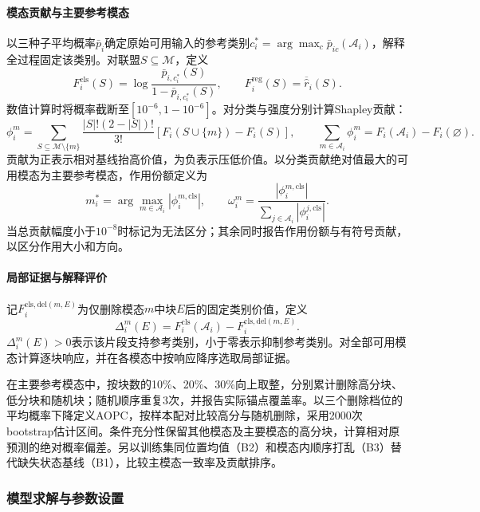 \paragraph{模态贡献与主要参考模态}
以三种子平均概率$\bar p_i$确定原始可用输入的参考类别$c_i^*=\arg\max_c\bar p_{ic}(\mathcal A_i)$，解释全过程固定该类别。对联盟$S\subseteq\mathcal M$，定义
\begin{equation}
F_i^{\mathrm{cls}}(S)=\log\frac{\bar p_{i,c_i^*}(S)}{1-\bar p_{i,c_i^*}(S)},\qquad
F_i^{\mathrm{reg}}(S)=\overline{\widehat r}_i(S).
\end{equation}
数值计算时将概率截断至$[10^{-6},1-10^{-6}]$。对分类与强度分别计算Shapley贡献：
\begin{equation}
\phi_i^m=\sum_{S\subseteq\mathcal M\setminus\{m\}}\frac{|S|!(2-|S|)!}{3!}
\left[F_i(S\cup\{m\})-F_i(S)\right],\qquad
\sum_{m\in\mathcal A_i}\phi_i^m=F_i(\mathcal A_i)-F_i(\varnothing).
\end{equation}
贡献为正表示相对基线抬高价值，为负表示压低价值。以分类贡献绝对值最大的可用模态为主要参考模态，作用份额定义为
\begin{equation}
m_i^*=\arg\max_{m\in\mathcal A_i}|\phi_i^{m,\mathrm{cls}}|,\qquad
\omega_i^m=\frac{|\phi_i^{m,\mathrm{cls}}|}{\sum_{j\in\mathcal A_i}|\phi_i^{j,\mathrm{cls}}|}.
\end{equation}
当总贡献幅度小于$10^{-8}$时标记为无法区分；其余同时报告作用份额与有符号贡献，以区分作用大小和方向。

\paragraph{局部证据与解释评价}
记$F_i^{\mathrm{cls,del}(m,E)}$为仅删除模态$m$中块$E$后的固定类别价值，定义
\begin{equation}
\Delta_i^m(E)=F_i^{\mathrm{cls}}(\mathcal A_i)-F_i^{\mathrm{cls,del}(m,E)}.
\end{equation}
$\Delta_i^m(E)>0$表示该片段支持参考类别，小于零表示抑制参考类别。对全部可用模态计算逐块响应，并在各模态中按响应降序选取局部证据。

在主要参考模态中，按块数的10\%、20\%、30\%向上取整，分别累计删除高分块、低分块和随机块；随机顺序重复3次，并报告实际锚点覆盖率。以三个删除档位的平均概率下降定义AOPC，按样本配对比较高分与随机删除，采用2000次bootstrap估计区间。条件充分性保留其他模态及主要模态的高分块，计算相对原预测的绝对概率偏差。另以训练集同位置均值（B2）和模态内顺序打乱（B3）替代缺失状态基线（B1），比较主模态一致率及贡献排序。

\subsubsection{模型求解与参数设置}
